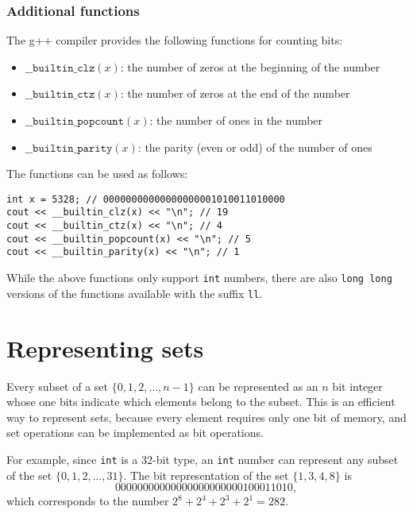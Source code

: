 \subsubsection*{Additional functions}

The g++ compiler provides the following
functions for counting bits:

\begin{itemize}
\item
$\texttt{\_\_builtin\_clz}(x)$:
the number of zeros at the beginning of the number
\item
$\texttt{\_\_builtin\_ctz}(x)$:
the number of zeros at the end of the number
\item
$\texttt{\_\_builtin\_popcount}(x)$:
the number of ones in the number
\item
$\texttt{\_\_builtin\_parity}(x)$:
the parity (even or odd) of the number of ones
\end{itemize}
\begin{samepage}

The functions can be used as follows:
\begin{lstlisting}
int x = 5328; // 00000000000000000001010011010000
cout << __builtin_clz(x) << "\n"; // 19
cout << __builtin_ctz(x) << "\n"; // 4
cout << __builtin_popcount(x) << "\n"; // 5
cout << __builtin_parity(x) << "\n"; // 1
\end{lstlisting}
\end{samepage}

While the above functions only support \texttt{int} numbers,
there are also \texttt{long long} versions of
the functions available with the suffix \texttt{ll}.

\section{Representing sets}

Every subset of a set
$\{0,1,2,\ldots,n-1\}$
can be represented as an $n$ bit integer
whose one bits indicate which
elements belong to the subset.
This is an efficient way to represent sets,
because every element requires only one bit of memory,
and set operations can be implemented as bit operations.

For example, since \texttt{int} is a 32-bit type,
an \texttt{int} number can represent any subset
of the set $\{0,1,2,\ldots,31\}$.
The bit representation of the set $\{1,3,4,8\}$ is
\[00000000000000000000000100011010,\]
which corresponds to the number $2^8+2^4+2^3+2^1=282$.

